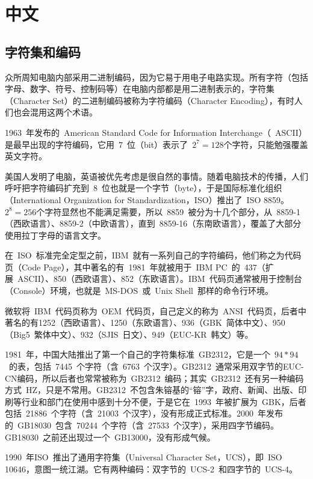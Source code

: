 \chapter{中文}

\section{字符集和编码}
\label{sec:encoding}

众所周知电脑内部采用二进制编码，因为它易于用电子电路实现。所有字符（包括字母、数字、符号、控制码等）在电脑内部都是用二进制表示的，字符集（Character Set）的二进制编码被称为字符编码（Character Encoding），有时人们也会混用这两个术语。

1963~年发布的~American Standard Code for Information Interchange（~ASCII）是最早出现的字符编码，它用~7~位（bit）表示了~$2^7=128$个字符，只能勉强覆盖英文字符。

美国人发明了电脑，英语被优先考虑是很自然的事情。随着电脑技术的传播，人们呼吁把字符编码扩充到~8~位也就是一个字节（byte），于是国际标准化组织（International Organization for Standardization，ISO）推出了~ISO 8859。$2^8=256$个字符显然也不能满足需要，所以~8859~被分为十几个部分，从~8859-1（西欧语言）、8859-2（中欧语言），直到~8859-16（东南欧语言），覆盖了大部分使用拉丁字母的语言文字。

在~ISO~标准完全定型之前，IBM~就有一系列自己的字符编码，他们称之为代码页（Code Page），其中著名的有~1981~年就被用于~IBM PC~的~437（扩展~ASCII）、850（西欧语言）、852（东欧语言）。IBM~代码页通常被用于控制台（Console）环境，也就是~MS-DOS~或~Unix Shell~那样的命令行环境。

微软将~IBM~代码页称为~OEM~代码页，自己定义的称为~ANSI~代码页，后者中著名的有1252（西欧语言）、1250（东欧语言）、936（GBK~简体中文）、950（Big5~繁体中文）、932（SJIS~日文）、949（EUC-KR~韩文）等。

1981~年，中国大陆推出了第一个自己的字符集标准~GB2312，它是一个~$94*94$~的表，包括~7445~个字符（含~6763~个汉字）。GB2312~通常采用双字节的EUC-CN编码，所以后者也常常被称为~GB2312~编码；其实~GB2312~还有另一种编码方式~HZ，只是不常用。GB2312~不包含朱镕基的“镕”字，政府、新闻、出版、印刷等行业和部门在使用中感到十分不便，于是它在~1993~年被扩展为~GBK，后者包括~21886~个字符（含~21003~个汉字），没有形成正式标准。2000~年发布的~GB18030~包含~70244~个字符（含~27533~个汉字），采用四字节编码。GB18030~之前还出现过一个~GB13000，没有形成气候。

1990~年ISO~推出了通用字符集（Universal Character Set，UCS），即~ISO 10646，意图一统江湖。它有两种编码：双字节的~UCS-2~和四字节的~UCS-4。

